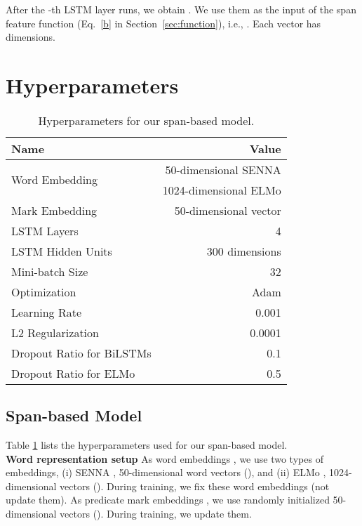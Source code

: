 \documentclass[11pt,a4paper]{article}
\begin{document}
After the -th LSTM layer runs, we obtain .
We use them as the input of the span feature function  (Eq.~\ref{b} in Section~\ref{sec:function}), i.e., .
Each vector  has  dimensions.


\section{Hyperparameters}
\label{sec:hparam}
\begin{table}[H]
  \centering
  {\small
  \begin{tabular}{lr} \toprule
    Name & Value \\ \hline
    \multirow{2}{*}{Word Embedding }
    & 50-dimensional SENNA \\
    & 1024-dimensional ELMo \\
    Mark Embedding  & 50-dimensional vector \\
    LSTM Layers  & 4 \\
    LSTM Hidden Units  & 300 dimensions \\
    Mini-batch Size & 32 \\
    Optimization & Adam \\
    Learning Rate & 0.001 \\
    L2 Regularization  & 0.0001 \\
    Dropout Ratio for BiLSTMs & 0.1 \\ 
    Dropout Ratio for ELMo & 0.5 \\ \toprule
  \end{tabular}
  }
  \caption{\label{tab:hyperparam} Hyperparameters for our span-based model.}
\end{table}

\subsection{Span-based Model}
Table \ref{tab:hyperparam} lists the hyperparameters used for our span-based model.\\

\vspace{-0.3cm}
\noindent
{\bf Word representation setup} \hspace{0.2cm} As word embeddings , we use two types of embeddings, (i) SENNA \cite{collobert:11}, 50-dimensional word vectors (), and (ii) ELMo \cite{peters:18}, 1024-dimensional vectors ().
During training, we fix these word embeddings (not update them).
As predicate mark embeddings , we use randomly initialized 50-dimensional vectors ().
During training, we update them.\\
\end{document}
